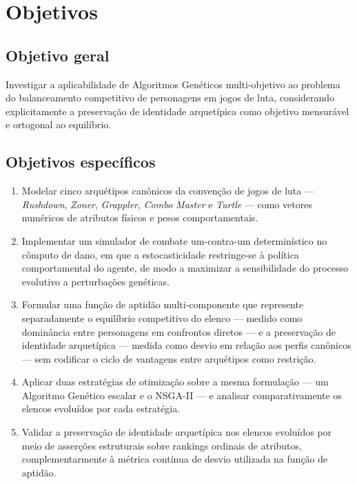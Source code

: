 \section{Objetivos}

\subsection{Objetivo geral}

Investigar a aplicabilidade de Algoritmos Genéticos multi-objetivo ao problema do balanceamento competitivo de personagens em jogos de luta, considerando explicitamente a preservação de identidade arquetípica como objetivo mensurável e ortogonal ao equilíbrio.

\subsection{Objetivos específicos}

\begin{enumerate}
    \item Modelar cinco arquétipos canônicos da convenção de jogos de luta --- \textit{Rushdown}, \textit{Zoner}, \textit{Grappler}, \textit{Combo Master} e \textit{Turtle} --- como vetores numéricos de atributos físicos e pesos comportamentais.
    \item Implementar um simulador de combate um-contra-um determinístico no cômputo de dano, em que a estocasticidade restringe-se à política comportamental do agente, de modo a maximizar a sensibilidade do processo evolutivo a perturbações genéticas.
    \item Formular uma função de aptidão multi-componente que represente separadamente o equilíbrio competitivo do elenco --- medido como dominância entre personagens em confrontos diretos --- e a preservação de identidade arquetípica --- medida como desvio em relação aos perfis canônicos --- sem codificar o ciclo de vantagens entre arquétipos como restrição.
    \item Aplicar duas estratégias de otimização sobre a mesma formulação --- um Algoritmo Genético escalar e o NSGA-II \cite{deb2002nsga} --- e analisar comparativamente os elencos evoluídos por cada estratégia.
    \item Validar a preservação de identidade arquetípica nos elencos evoluídos por meio de asserções estruturais sobre rankings ordinais de atributos, complementarmente à métrica contínua de desvio utilizada na função de aptidão.
\end{enumerate}

